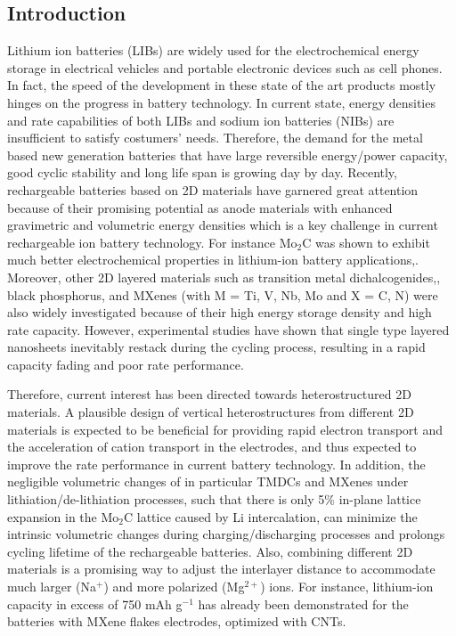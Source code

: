 \subsection{Introduction}
Lithium ion batteries (LIBs) are widely used for the electrochemical energy storage in electrical vehicles and portable electronic devices such as cell phones. In fact, the speed of the development in these state of the art products mostly hinges on the progress in battery technology. In current state, energy densities and rate capabilities of both LIBs and sodium ion batteries (NIBs) are insufficient to satisfy costumers' needs. Therefore, the demand for the metal based new generation batteries that have large reversible energy/power capacity, good cyclic stability and long life span is growing day by day. Recently, rechargeable batteries based on 2D materials have garnered great attention because of their promising potential as anode materials with enhanced gravimetric and volumetric energy densities which is a key challenge in current rechargeable ion battery technology. For instance Mo$_2$C was shown to exhibit much better electrochemical properties in lithium-ion battery applications,\cite{mo2c-ref8, mo2c-ref10}. Moreover, other 2D layered materials such as transition metal dichalcogenides,\cite{mo2c-ref11, mo2c-ref12}, black phosphorus\cite{mo2c-ref18, mo2c-ref20}, and MXenes (with M = Ti, V, Nb, Mo and X = C, N)\cite{mo2c-ref13, mo2c-ref17} were also widely investigated because of their high energy storage density and high rate capacity. However, experimental studies have shown that single type layered nanosheets inevitably restack during the cycling process, resulting in a rapid capacity fading and poor rate performance. 

Therefore, current interest has been directed towards heterostructured\cite{C5CS00937E,Pomerantseva_Gogotsi_2017} 2D materials. A plausible design of vertical heterostructures from different 2D materials is expected to be beneficial for providing rapid electron transport and the acceleration of cation transport in the electrodes, and thus expected to improve the rate performance in current battery technology\cite{Pomerantseva_Gogotsi_2017}. In addition, the negligible volumetric changes of in particular TMDCs and MXenes under lithiation/de-lithiation processes, such that there is only 5\% in-plane lattice expansion in the Mo$_2$C lattice caused by Li intercalation\cite{C6TA01918H}, can minimize the intrinsic volumetric changes during charging/discharging processes and prolongs cycling lifetime of the rechargeable batteries. Also, combining different 2D materials is a promising way to adjust the interlayer distance to accommodate much larger (Na$^{+}$) and more polarized (Mg$^{2+}$) ions. For instance, lithium-ion capacity in excess of 750 mAh g$^{-1}$\cite{CELC:CELC201600059} has already been demonstrated for the batteries with MXene flakes electrodes, optimized with CNTs.

